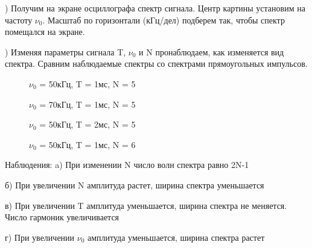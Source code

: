 \documentclass[a4paper,12pt]{article}
\begin{document}
) Получим на экране осциллографа спектр сигнала. Центр картины установим на частоту $\nu_0$. Масштаб по горизонтали (кГц/дел) подберем так, чтобы спектр помещался на экране. 

) Изменяя параметры сигнала T, $\nu_0$ и N пронаблюдаем, как изменяется вид спектра. Сравним наблюдаемые спектры со спектрами прямоугольных импульсов. 

\begin{figure}
\caption{$\nu_0$ = 50кГц, T = 1мс, N = 5}
\caption{$\nu_0$ = 70кГц, T = 1мс, N = 5}
\caption{$\nu_0$ = 50кГц, T = 2мс, N = 5}
\caption{$\nu_0$ = 50кГц, T = 1мс, N = 6}
\end{figure}

Наблюдения: a) При изменении N число волн спектра равно 2N-1
\par		б) При увеличении N амплитуда растет, ширина спектра уменьшается
\par		в) При увеличении T амплитуда уменьшается, ширина спектра не меняется. Число гармоник увеличивается
\par 		г) При увеличении $\nu_0$ амплитуда уменьшается, ширина спектра растет 
\end{document}
